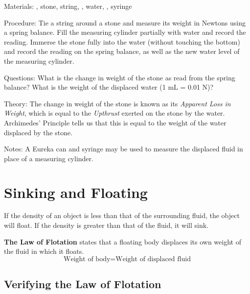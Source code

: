 \begin{multicols}{2}
\begin{description*}
\item[Materials:]{, stone, string, , water, , syringe}
\item[Procedure:]{Tie a string around a stone and measure its weight in Newtons using a spring balance. Fill the measuring cylinder partially with water and record the reading. Immerse the stone fully into the water (without touching the bottom) and record the reading on the spring balance, as well as the new water level of the measuring cylinder.}
\item[Questions:]{What is the change in weight of the stone as read from the spring balance? What is the weight of the displaced water (1 mL = 0.01 N)?}
\item[Theory:]{The change in weight of the stone is known as its \emph{Apparent Loss in Weight}, which is equal to the \emph{Upthrust} exerted on the stone by the water. Archimedes' Principle tells us that this is equal to the weight of the water displaced by the stone.}
\item[Notes:]{A Eureka can and syringe may be used to measure the displaced fluid in place of a measuring cylinder.}
\end{description*}


\section*{Sinking and Floating}
If the density of an object is less than that of the surrounding fluid, the object will float. If the density is greater than that of the fluid, it will sink.

\textbf{The Law of Flotation} states that a floating body displaces its own weight of the fluid in which it floats.
$$\text{Weight of body} = \text{Weight of displaced fluid}$$


\subsection{Verifying the Law of Flotation}


\end{multicols}
